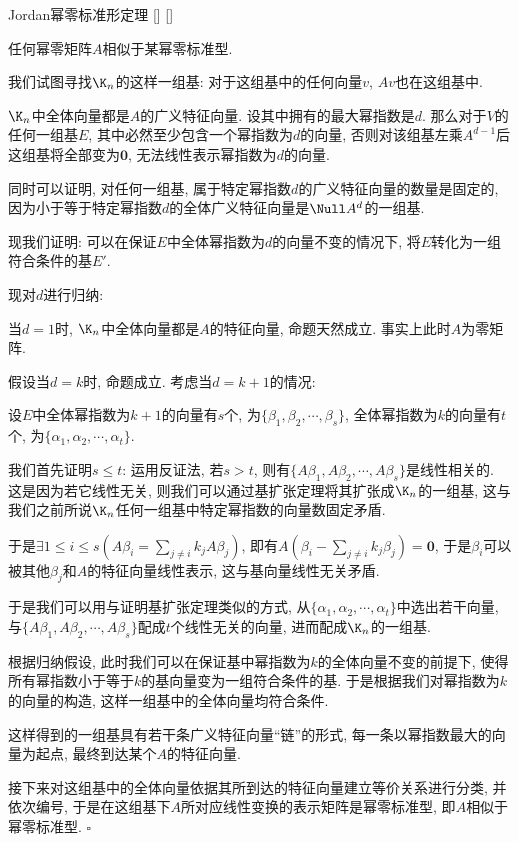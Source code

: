 \documentclass[UTF8]{ctexart}
\begin{document}
		\begin{thm}
			[]
			{Jordan幂零标准形定理}
			[]
			[]

			任何幂零矩阵$A$相似于某幂零标准型. 
		\end{thm}

		\begin{prf}

			我们试图寻找$\K_n$的这样一组基: 对于这组基中的任何向量$v$, $Av$也在这组基中. 

			$\K_n$中全体向量都是$A$的广义特征向量. 设其中拥有的最大幂指数是$d$. 那么对于$V$的任何一组基$E$, 其中必然至少包含一个幂指数为$d$的向量, 否则对该组基左乘$A^{d-1}$后这组基将全部变为$\mathbf{0}$, 无法线性表示幂指数为$d$的向量. 

			同时可以证明, 对任何一组基, 属于特定幂指数$d$的广义特征向量的数量是固定的, 因为小于等于特定幂指数$d$的全体广义特征向量是$\Null A^d$的一组基. 

			现我们证明: 可以在保证$E$中全体幂指数为$d$的向量不变的情况下, 将$E$转化为一组符合条件的基$E'$. 

			现对$d$进行归纳: 

			当$d=1$时, $\K_n$中全体向量都是$A$的特征向量, 命题天然成立. 事实上此时$A$为零矩阵. 

			假设当$d=k$时, 命题成立. 考虑当$d=k+1$的情况: 
			
			设$E$中全体幂指数为$k+1$的向量有$s$个, 为$\{\beta_1,\beta_2,\cdots,\beta_s\}$, 全体幂指数为$k$的向量有$t$个, 为$\{\alpha_1,\alpha_2,\cdots,\alpha_t\}$. 

			我们首先证明$s\leq t$: 运用反证法, 若$s>t$, 则有$\{A\beta_1,A\beta_2,\cdots, A\beta_s\}$是线性相关的. 这是因为若它线性无关, 则我们可以通过基扩张定理将其扩张成$\K_n$的一组基, 这与我们之前所说$\K_n$任何一组基中特定幂指数的向量数固定矛盾. 
			
			于是$\exists 1\leq i\leq s(A\beta_i =\sum\limits_{j\neq i}k_j A\beta_j)$, 即有$A(\beta_i-\sum\limits_{j\neq i}k_j \beta_j)=\mathbf{0}$, 于是$\beta_i$可以被其他$\beta_j$和$A$的特征向量线性表示, 这与基向量线性无关矛盾. 

			于是我们可以用与证明基扩张定理类似的方式, 从$\{\alpha_1,\alpha_2,\cdots,\alpha_t\}$中选出若干向量, 与$\{A\beta_1,A\beta_2,\cdots,A\beta_s\}$配成$t$个线性无关的向量, 进而配成$\K_n$的一组基. 

			根据归纳假设, 此时我们可以在保证基中幂指数为$k$的全体向量不变的前提下, 使得所有幂指数小于等于$k$的基向量变为一组符合条件的基. 于是根据我们对幂指数为$k$的向量的构造, 这样一组基中的全体向量均符合条件. 

			这样得到的一组基具有若干条广义特征向量``链''的形式, 每一条以幂指数最大的向量为起点, 最终到达某个$A$的特征向量. 

			接下来对这组基中的全体向量依据其所到达的特征向量建立等价关系进行分类, 并依次编号, 于是在这组基下$A$所对应线性变换的表示矩阵是幂零标准型, 即$A$相似于幂零标准型. $\square$
		\end{prf}
\end{document}
